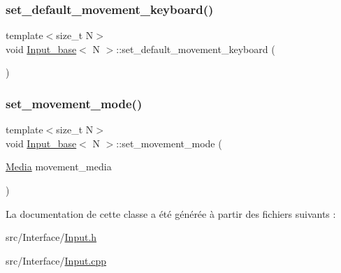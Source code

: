 \mbox{\label{class_input__base_ae4092ec083ca10480a0fd61301b336f1}} 
\subsubsection{\texorpdfstring{set\+\_\+default\+\_\+movement\+\_\+keyboard()}{set\_default\_movement\_keyboard()}}
{\footnotesize\ttfamily template$<$size\+\_\+t N$>$ \\
void \hyperlink{class_input__base}{Input\+\_\+base}$<$ N $>$\+::set\+\_\+default\+\_\+movement\+\_\+keyboard (\begin{DoxyParamCaption}{ }\end{DoxyParamCaption})}

\mbox{\label{class_input__base_a103633f42d3fa58352a12b54ed4b3faf}} 
\subsubsection{\texorpdfstring{set\+\_\+movement\+\_\+mode()}{set\_movement\_mode()}}
{\footnotesize\ttfamily template$<$size\+\_\+t N$>$ \\
void \hyperlink{class_input__base}{Input\+\_\+base}$<$ N $>$\+::set\+\_\+movement\+\_\+mode (\begin{DoxyParamCaption}\item[{\hyperlink{class_input__base_a455585e7933485981b3d7bfcad3a47c6}{Media}}]{movement\+\_\+media }\end{DoxyParamCaption})}



La documentation de cette classe a été générée à partir des fichiers suivants \+:\begin{DoxyCompactItemize}
\item 
src/\+Interface/\hyperlink{_input_8h}{Input.\+h}\item 
src/\+Interface/\hyperlink{_input_8cpp}{Input.\+cpp}\end{DoxyCompactItemize}
